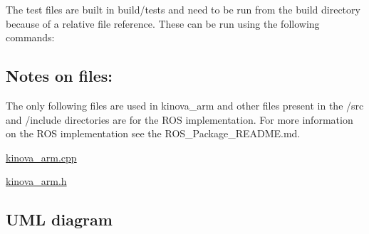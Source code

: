 The test files are built in build/tests and need to be run from the build directory because of a relative file reference. These can be run using the following commands\+: 


\subsection*{Notes on files\+:}

The only following files are used in kinova\+\_\+arm and other files present in the /src and /include directories are for the R\+OS implementation. For more information on the R\+OS implementation see the R\+O\+S\+\_\+\+Package\+\_\+\+R\+E\+A\+D\+M\+E.\+md.


\begin{DoxyItemize}
\item \hyperlink{kinova__arm_8cpp}{kinova\+\_\+arm.\+cpp}
\item \hyperlink{kinova__arm_8h}{kinova\+\_\+arm.\+h}
\end{DoxyItemize}

\subsection*{U\+ML diagram}



 